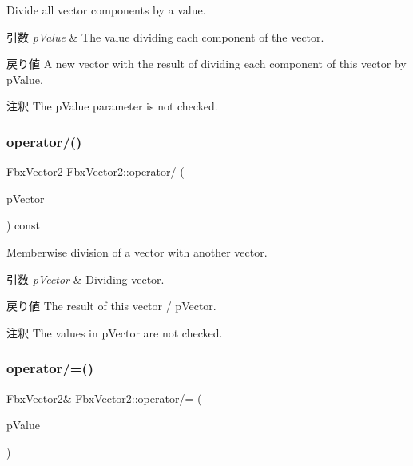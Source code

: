 Divide all vector components by a value. 
\begin{DoxyParams}{引数}
{\em p\+Value} & The value dividing each component of the vector. \\
\hline
\end{DoxyParams}
\begin{DoxyReturn}{戻り値}
A new vector with the result of dividing each component of this vector by p\+Value. 
\end{DoxyReturn}
\begin{DoxyRemark}{注釈}
The p\+Value parameter is not checked. 
\end{DoxyRemark}
\mbox{\label{class_fbx_vector2_a8a5b9035fefe1229eedeb323c1473320}} 
\subsubsection{\texorpdfstring{operator/()}{operator/()}\hspace{0.1cm}{\footnotesize\ttfamily [2/2]}}
{\footnotesize\ttfamily \hyperlink{class_fbx_vector2}{Fbx\+Vector2} Fbx\+Vector2\+::operator/ (\begin{DoxyParamCaption}\item[{const \hyperlink{class_fbx_vector2}{Fbx\+Vector2} \&}]{p\+Vector }\end{DoxyParamCaption}) const}

Memberwise division of a vector with another vector. 
\begin{DoxyParams}{引数}
{\em p\+Vector} & Dividing vector. \\
\hline
\end{DoxyParams}
\begin{DoxyReturn}{戻り値}
The result of this vector / p\+Vector. 
\end{DoxyReturn}
\begin{DoxyRemark}{注釈}
The values in p\+Vector are not checked. 
\end{DoxyRemark}
\mbox{\label{class_fbx_vector2_a3d60afc7bacc3f7db4b455b2aae7d6ec}} 
\subsubsection{\texorpdfstring{operator/=()}{operator/=()}\hspace{0.1cm}{\footnotesize\ttfamily [1/2]}}
{\footnotesize\ttfamily \hyperlink{class_fbx_vector2}{Fbx\+Vector2}\& Fbx\+Vector2\+::operator/= (\begin{DoxyParamCaption}\item[{double}]{p\+Value }\end{DoxyParamCaption})}

